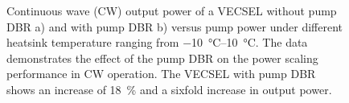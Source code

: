 \begin{figure}[ht]
    \centering
    \hfill
    \caption{Continuous wave (CW) output power of a VECSEL without pump DBR a) and with pump DBR b) versus pump power under different heatsink temperature ranging from \qtyrange{-10}{10}{\celsius}. The data demonstrates the effect of the pump DBR on the power scaling performance in CW operation. The VECSEL with pump DBR shows an increase of \qty{18}{\percent} and a sixfold increase in output power.}
    \label{fig:pslope}
\end{figure}



